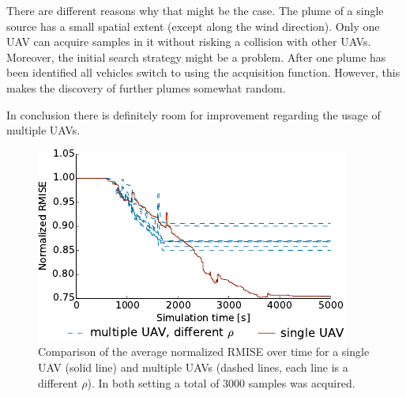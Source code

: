 There are different reasons why that might be the case. The plume of a single 
source has a small spatial extent (except along the wind direction). Only one 
UAV can acquire samples in it without risking a collision with other UAVs.  
Moreover, the initial search strategy might be a problem. After one plume has 
been identified all vehicles switch to using the acquisition function. However, 
this makes the discovery of further plumes somewhat random.

In conclusion there is definitely room for improvement regarding the usage of 
multiple UAVs.

\begin{figure}
    \centering
    \includegraphics{plots/sv-vs-mv}
    \caption[Comparison of single and multiple UAV performance]{Comparison of 
        the average normalized RMISE over time for a single UAV (solid line) and 
        multiple UAVs (dashed lines, each line is a different $\rho$). In both 
        setting a total of \num{3000} samples was acquired.}\label{fig:sv-vs-mv}
\end{figure}

